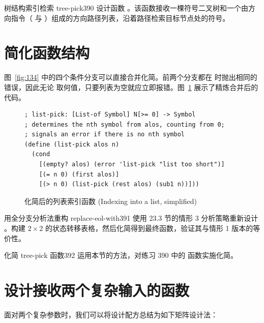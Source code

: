 \begin{exercise}{树结构索引检索 tree-pick}{390}
设计函数 。该函数接收一棵符号二叉树和一个由方向指令（ 与 ）组成的方向路径列表，沿着路径检索目标节点处的符号。
\end{exercise}

\section{简化函数结构}
\label{sec:23.4_simplification}

图~\ref{fig:134} 中的四个条件分支可以直接合并化简。前两个分支都在  时抛出相同的错误，因此无论  取何值，只要列表为空就应立即报错。图~\ref{fig:135} 展示了精炼合并后的代码。

\begin{figure}[htbp]
  \centering
\begin{lstlisting}[language=BSL, basicstyle=\scriptsize\ttfamily]
; list-pick: [List-of Symbol] N[>= 0] -> Symbol
; determines the nth symbol from alos, counting from 0;
; signals an error if there is no nth symbol
(define (list-pick alos n)
  (cond
    [(empty? alos) (error 'list-pick "list too short")]
    [(= n 0) (first alos)]
    [(> n 0) (list-pick (rest alos) (sub1 n))]))
\end{lstlisting}
  \caption{化简后的列表索引函数 (Indexing into a list, simplified)}
  \label{fig:135}
\end{figure}

\begin{exercise}{用全分支分析法重构 replace-eol-with}{391}
使用 23.3 节的情形 3 分析策略重新设计 。构建 $2 \times 2$ 的状态转移表格，然后化简得到最终函数，验证其与情形 1 版本的等价性。
\end{exercise}

\begin{exercise}{化简 tree-pick 函数}{392}
运用本节的方法，对练习 390 中的  函数实施化简。
\end{exercise}

\section{设计接收两个复杂输入的函数 }
\label{sec:23.5_recipe_two_inputs}

面对两个复杂参数时，我们可以将设计配方总结为如下矩阵设计法：

